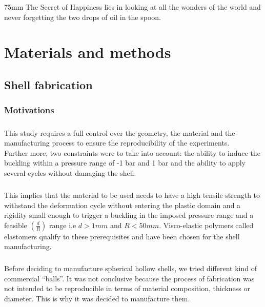 \begin{savequote} 75mm 
The Secret of Happiness lies in looking at all the wonders of the world and never forgetting the two drops of oil in the spoon.
\end{savequote}

\chapter{Materials and methods}

\section{Shell fabrication}
\subsection{Motivations}
\paragraph{}
This study requires a full control over the geometry, the material and the manufacturing process to ensure the reproducibility of the experiments.\\
Further more, two constraints were to take into account: the ability to induce the buckling within a pressure range of -1 bar and 1 bar and the ability to apply several cycles without damaging the shell. 
\paragraph{}This implies that the material to be used needs to have a high tensile strength to withstand the deformation cycle without entering the plastic domain and a rigidity small enough to trigger a buckling in the imposed pressure range and a feasible $(\frac{d}{R})$ range i.e $d > 1 mm$ and $R < 50 mm$. Visco-elastic polymers called elastomers qualify to these prerequisites and have been chosen for the shell manufacturing.
\paragraph{}
Before deciding to manufacture spherical hollow shells, we tried different kind of commercial "`balls"'. It was not conclusive because the process of fabrication was not intended to be reproducible in terms of material composition, thickness or diameter. This is why it was decided to manufacture them.
